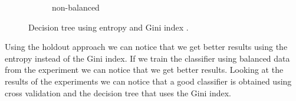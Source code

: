\documentclass{article}
\begin{document}
\begin{figure}[H]
\begin{subfigure}{.5\textwidth}
		\caption{non-balanced}
	\end{subfigure}
	\caption{{\color{red} Decision tree using entropy and Gini index .}}
\end{figure}


Using the holdout approach we can notice that we get better results using the entropy instead of the Gini index. If we train the classifier using balanced data from the experiment we can notice that we get better results. Looking at the results of the experiments we can notice that a good classifier is obtained using cross validation and the decision tree that uses the Gini index.





\clearpage
{}


\newpage

\appendix


\end{document}
